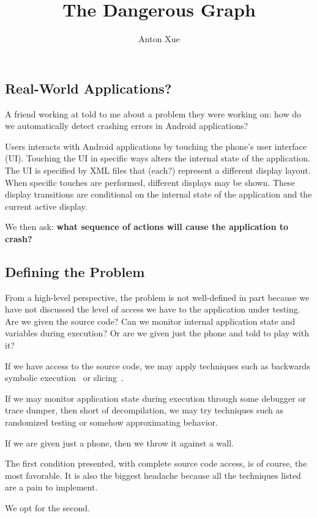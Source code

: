 \documentclass[12pt]{article}
\title{The Dangerous Graph}
\author{Anton Xue}
\date{}
\let\company\undefined
\newcommand{\company}{\textbf{Big Tech Company}}
\newcommand{\android}{Android}
\begin{document}
\maketitle

\subsection{Real-World Applications?}

A friend working at \company{} told to me about a problem
they were working on:
how do we automatically detect crashing errors in \android{} applications?

Users interacts with \android{} applications by touching
the phone's user interface (UI).
Touching the UI in specific ways alters the internal state of the application.
The UI is specified by XML files that (each?) represent a
different display layout.
When specific touches are performed, different displays may be shown.
These display transitions are conditional on the internal state of the
application and the current active display.

We then ask:
\textbf{what sequence of actions will cause the application to crash?}


\subsection{Defining the Problem}
From a high-level perspective, the problem is not well-defined in part
because we have not discussed the level of access we have to the
application under testing.
Are we given the source code?
Can we monitor internal application state and variables during execution?
Or are we given just the phone and told to play with it?

If we have access to the source code, we may apply techniques such as
backwards symbolic execution~\cite{baldoni-backwards} or
slicing~\cite{weiser-slicing}.

If we may monitor application state during execution through some debugger
or trace dumper, then short of decompilation, we may try techniques such
as randomized testing or somehow approximating behavior.

If we are given just a phone, then we throw it against a wall.

The first condition presented, with complete source code access, is of
course, the most favorable.
It is also the biggest headache because all the techniques listed are
a pain to implement.

We opt for the second.
\end{document}
